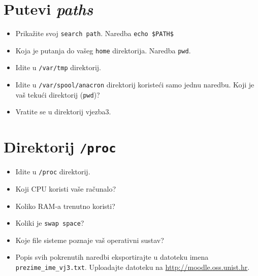\section{Putevi \textit{paths}}
\begin{itemize}
 \item Prikažite svoj \texttt{search path}. Naredba \texttt{echo \$PATH\$}
\item Koja je putanja do vašeg \texttt{home} direktorija. Naredba \texttt{pwd}. 
\item Idite u \texttt{/var/tmp} direktorij.
\item Idite u \texttt{/var/spool/anacron} direktorij koristeći samo jednu naredbu. Koji je vaš tekući direktorij (\texttt{pwd})?
\item Vratite se u direktorij vjezba3.
\end{itemize}

\section{Direktorij \texttt{/proc} }
\begin{itemize}
 \item Idite u \texttt{/proc} direktorij.
\item Koji CPU koristi vaše računalo?
\item Koliko RAM-a trenutno koristi?
\item Koliki je \texttt{swap space}?
\item Koje file sisteme poznaje vaš operativni sustav?
\end{itemize}

\vfill
\begin{itemize}
\renewcommand{\labelitemi}{\textbf{$\rightarrow$}}
\item Popis svih pokrenutih naredbi eksportirajte u datoteku imena \texttt{prezime\_ime\_vj3.txt}. Uploadajte datoteku na \href{https://moodle.oss.unist.hr/course/view.php?id=133}{http://moodle.oss.unist.hr}.
\end{itemize}
